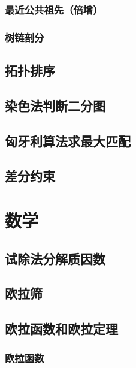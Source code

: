 \documentclass[10pt,a4paper]{article}
\begin{document}
\subsubsection{最近公共祖先（倍增）}

\subsubsection{树链剖分}

\subsection{拓扑排序}

\subsection{染色法判断二分图}

\subsection{匈牙利算法求最大匹配}

\subsection{差分约束}
\begin{spacing}{1.5}

\end{spacing}

\section{数学}
\subsection{试除法分解质因数}

\subsection{欧拉筛}

\subsection{欧拉函数和欧拉定理}
\subsubsection{欧拉函数}
\begin{spacing}{1.5}

\end{spacing}

\end{document}

